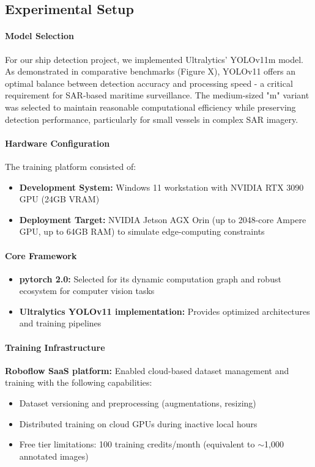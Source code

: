 \documentclass{article}
\begin{document}
	\subsection{Experimental Setup}
	\paragraph{Model Selection}
	For our ship detection project, we implemented Ultralytics' YOLOv11m model. As demonstrated in comparative benchmarks (Figure X), YOLOv11 offers an optimal balance between detection accuracy and processing speed - a critical requirement for SAR-based maritime surveillance. The medium-sized "m" variant was selected to maintain reasonable computational efficiency while preserving detection performance, particularly for small vessels in complex SAR imagery. \paragraph{Hardware Configuration}
	The training platform consisted of:
	
	\begin{itemize}
		\item \textbf{Development System:} Windows 11 workstation with NVIDIA RTX 3090 GPU (24GB VRAM)
\item \textbf{Deployment Target:} NVIDIA Jetson AGX Orin (up to 2048-core Ampere GPU, up to 64GB RAM) to simulate edge-computing constraints
\end{itemize}
	
	
	\paragraph{Core Framework}
	\begin{itemize}
		\item \textbf{\acrshort{pytorch} 2.0:} Selected for its dynamic computation graph and robust ecosystem for computer vision tasks
		\item \textbf{Ultralytics YOLOv11 implementation:} Provides optimized architectures and training pipelines
	\end{itemize}
	
	\paragraph{Training Infrastructure}
	\textbf{Roboflow SaaS platform:} Enabled cloud-based dataset management and training with the following capabilities:
	\begin{itemize}
		\item Dataset versioning and preprocessing (augmentations, resizing)
		\item Distributed training on cloud GPUs during inactive local hours
		\item Free tier limitations: 100 training credits/month (equivalent to $\sim$1,000 annotated images)
	\end{itemize}
	
\end{document}
